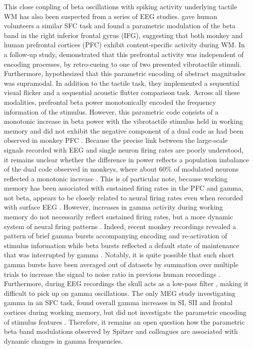 This close coupling of beta oscillations with spiking activity underlying tactile WM has also been suspected from a series of EEG studies. \textcite{Spitzer2010} gave human volunteers a similar SFC task and found a parametric modulation of the beta band in the right inferior frontal gyrus (IFG), suggesting that both monkey and human prefrontal cortices (PFC) exhibit content-specific activity during WM. In a follow-up study, \textcite{Spitzer2011} demonstrated that this prefrontal activity was independent of encoding processes, by retro-cueing to one of two presented vibrotactile stimuli. Furthermore, \textcite{Spitzer2012} hypothesized that this parametric encoding of abstract magnitudes was supramodal. In addition to the tactile task, they implemented a sequential visual flicker and a sequential acoustic flutter comparison task. Across all these modalities, prefrontal beta power monotonically encoded the frequency information of the stimulus. However, this parametric code consists of a monotonic increase in beta power with the vibrotactile stimulus held in working memory and did not exhibit the negative component of a dual code as had been observed in monkey PFC \parencite{Romo1999}. Because the precise link between the large-scale signals recorded with EEG and single neuron firing rates are poorly understood, it remains unclear whether the difference in power reflects a population imbalance of the dual code observed in monkeys, where about 60\% of modulated neurons reflected a monotonic increase \parencite{Romo1999,Spitzer2010}. This is of particular note, because working memory has been associated with sustained firing rates in the PFC \parencite{Funahashi1989,Fuster1971,Goldman-Rakic1995,Pasternak2005} and gamma, not beta, appears to be closely related to neural firing rates even when recorded with surface EEG \parencite{Whittingstall2009}. However, increases in gamma activity during working memory do not necessarily reflect sustained firing rates, but a more dynamic system of neural firing patterns \parencite{Cromer2010,Durstewitz2006,Shafi2007,Stokes2013}. Indeed, recent monkey recordings revealed a pattern of brief gamma bursts accompanying encoding and re-activation of stimulus information while beta bursts reflected a default state of maintenance that was interrupted by gamma \parencite{Lundqvist2016}. Notably, it is quite possible that such short gamma bursts have been averaged out of datasets by summation over multiple trials to increase the signal to noise ratio in previous human recordings \parencite{Stokes2016}. Furthermore, during EEG recordings the skull acts as a low-pass filter \parencite{Pfurtscheller1975}, making it difficult to pick up on gamma oscillations. The only MEG study investigating gamma in an SFC task, found overall gamma increases in SI, SII and frontal cortices during working memory, but did not investigate the parametric encoding of stimulus features \parencite{Haegens2010}. Therefore, it remains an open question how the parametric beta band modulations observed by Spitzer and colleagues are associated with dynamic changes in gamma frequencies. 
